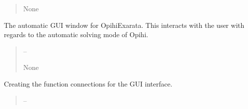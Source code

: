 \documentclass[letterpaper,11pt,english]{sphinxmanual}
\begin{document}
\begin{savenotes}
\begin{fulllineitems}
\begin{savenotes}
\begin{fulllineitems}
\begin{quote}
\begin{description}
\sphinxAtStartPar
None

\end{description}\end{quote}

\end{fulllineitems}\end{savenotes}


\begin{savenotes}\begin{fulllineitems}
\label{\detokenize{code/opihiexarata.gui.automatic:opihiexarata.gui.automatic.OpihiAutomaticWindow.__init__}}
\pysigstartsignatures
{}
\pysigstopsignatures
\sphinxAtStartPar
The automatic GUI window for OpihiExarata. This interacts with
the user with regards to the automatic solving mode of Opihi.
\begin{quote}\begin{description}
\sphinxAtStartPar
{} – 

\sphinxAtStartPar
None

\end{description}\end{quote}

\end{fulllineitems}\end{savenotes}


\begin{savenotes}\begin{fulllineitems}
\label{\detokenize{code/opihiexarata.gui.automatic:opihiexarata.gui.automatic.OpihiAutomaticWindow.__init_gui_connections}}
\pysigstartsignatures
{}
\pysigstopsignatures
\sphinxAtStartPar
Creating the function connections for the GUI interface.
\begin{quote}\begin{description}
\sphinxAtStartPar
{} – 


\end{description}
\end{quote}
\end{fulllineitems}
\end{savenotes}
\end{fulllineitems}
\end{savenotes}
\end{document}
